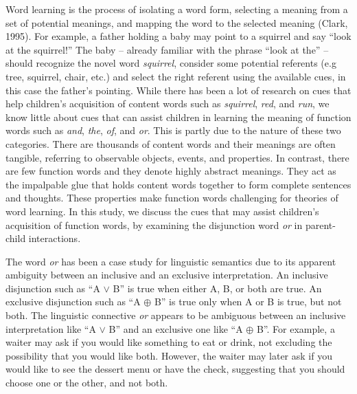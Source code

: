 \documentclass[10pt, letterpaper]{article}
\begin{document}
Word learning is the process of isolating a word form, selecting a
meaning from a set of potential meanings, and mapping the word to the
selected meaning (Clark, 1995). For example, a father holding a baby may
point to a squirrel and say ``look at the squirrel!'' The baby --
already familiar with the phrase ``look at the'' -- should recognize the
novel word \emph{squirrel}, consider some potential referents (e.g tree,
squirrel, chair, etc.) and select the right referent using the available
cues, in this case the father's pointing. While there has been a lot of
research on cues that help children's acquisition of content words such
as \emph{squirrel}, \emph{red}, and \emph{run}, we know little about
cues that can assist children in learning the meaning of function words
such as \emph{and}, \emph{the}, \emph{of}, and \emph{or}. This is partly
due to the nature of these two categories. There are thousands of
content words and their meanings are often tangible, referring to
observable objects, events, and properties. In contrast, there are few
function words and they denote highly abstract meanings. They act as the
impalpable glue that holds content words together to form complete
sentences and thoughts. These properties make function words challenging
for theories of word learning. In this study, we discuss the cues that
may assist children's acquisition of function words, by examining the
disjunction word \emph{or} in parent-child interactions.

The word \emph{or} has been a case study for linguistic semantics due to
its apparent ambiguity between an inclusive and an exclusive
interpretation. An inclusive disjunction such as ``A \(\vee\) B'' is
true when either A, B, or both are true. An exclusive disjunction such
as ``A \(\oplus\) B'' is true only when A or B is true, but not both.
The linguistic connective \emph{or} appears to be ambiguous between an
inclusive interpretation like ``A \(\vee\) B'' and an exclusive one like
``A \(\oplus\) B''. For example, a waiter may ask if you would like
something to eat or drink, not excluding the possibility that you would
like both. However, the waiter may later ask if you would like to see
the dessert menu or have the check, suggesting that you should choose
one or the other, and not both.
\end{document}
